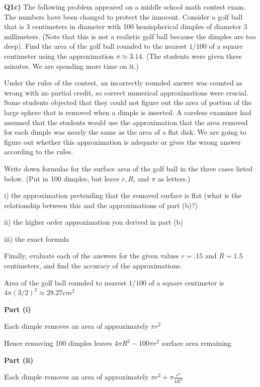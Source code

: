 \documentclass[9pt]{article}
\begin{document}
\begin{tcolorbox}
	  \parskip10pt\relax
  \textbf{Q1c)} The following problem appeared on a middle school math contest exam. The numbers have been changed to protect the innocent. Consider a golf ball that is 3 centimeters in diameter with 100 hemispherical dimples of diameter 3 millimeters. (Note that this is not a realistic golf ball because the dimples are too deep). Find the area of the golf ball rounded to the nearest $1/100$ of a square centimeter using the approximation $\pi \approx 3.14$. (The students were given three minutes. We are spending more time on it.)

  Under the rules of the contest, an incorrectly rounded answer was counted as wrong with no partial credit, so correct numerical approximations were crucial. Some students objected that they could not figure out the area of portion of the large sphere that is removed when a dimple is inserted. A careless examiner had assumed that the students would use the approximation that the area removed for each dimple was nearly the same as the area of a flat disk. We are going to figure out whether this approximation is adequate or gives the wrong answer according to the rules.

  Write down formulas for the surface area of the golf ball in the three cases listed below. (Put in 100 dimples, but leave $r, R$, and $\pi$ as letters.)
  
  i) the approximation pretending that the removed surface is flat (what is the relationship between this and the approximations of part (b)?)
  
  ii) the higher order approximation you derived in part (b)
  
  iii) the exact formula
  
  Finally, evaluate each of the answers for the given values $r = .15$ and $R = 1.5$ centimeters, and find the accuracy of the approximations.
\end{tcolorbox}

Area of the golf ball rounded to nearest $1 / 100$ of a square centimeter is $4 \pi (3 / 2)^2 \approx 28.27 cm^2$

\textbf{Part (i)}

Each dimple removes an area of approximately $\pi r^2$

Hence removing 100 dimples leaves $4 \pi R^2 - 100 \pi r^2$ surface area remaining

\textbf{Part (ii)}

Each dimple removes an area of approximately $\pi r^2 + \pi \frac{r^4}{4R^2}$
\end{document}
